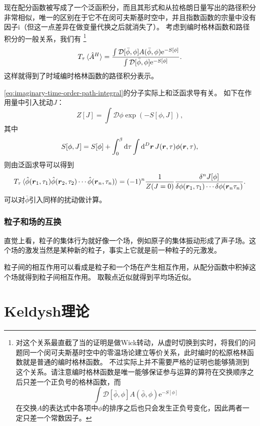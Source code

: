 \documentclass[hyperref, UTF8, a4paper]{ctexart}
\newcommand*{\ii}{\mathrm{i}}
\newcommand*{\ee}{\mathrm{e}}
\newcommand*{\fd}[1]{\mathcal{D}{#1}}
\begin{document}
现在配分函数被写成了一个泛函积分，而且其形式和从拉格朗日量写出的路径积分非常相似，唯一的区别在于它不在闵可夫斯基时空中，并且指数函数的宗量中没有因子$\ii$（但这一点差异在做变量代换之后就消失了）。
考虑到编时格林函数和路径积分的一般关系，我们有%
\footnote{对这个关系最直截了当的证明是做Wick转动，从虚时切换到实时，将我们的问题同一个闵可夫斯基时空中的零温场论建立等价关系，此时编时的松原格林函数就是普通的编时格林函数。
不过实际上并不需要严格的证明也能够猜测到这个关系。请注意编时格林函数是唯一能够保证参与运算的算符在交换顺序之后只差一个正负号的格林函数，而
\[
    \int \fd{[\bar{\phi}, \phi]} A(\bar{\phi}, \phi) \ee^{- S[\phi]}
\]
在交换$A$的表达式中各项中$\phi$的排序之后也只会发生正负号变化，因此两者一定只差一个常数因子。
}%
\begin{equation}
    T_\tau \expval*{\hat{A}^H} = \frac{\int \fd{[\bar{\phi}, \phi]} A(\bar{\phi}, \phi) \ee^{- S[\phi]}}{\int \fd{[\bar{\phi}, \phi]} \ee^{- S[\phi]}}.
    \label{eq:imaginary-time-order-path-integral}
\end{equation}
这样就得到了时域编时格林函数的路径积分表示。

\eqref{eq:imaginary-time-order-path-integral}的分子实际上和泛函求导有关。
如下在作用量中引入扰动$J$：
\begin{equation}
    Z[J] = \int \fd{\phi} \exp ( - S[\phi, J] ),
\end{equation}
其中
\begin{equation}
    S[\phi, J] = S[\phi] + \int_0^\beta \dd{\tau} \int \dd[D]{\vb*{r}} J(\vb*{r}, \tau) \phi(\vb*{r}, \tau),
\end{equation}
则由泛函求导可以得到
\begin{equation}
    T_\tau \expval*{\hat{\phi}(\vb*{r}_1, \tau_1) \hat{\phi}(\vb*{r}_2, \tau_2) \cdots \hat{\phi}(\vb*{r}_n, \tau_n)} = (-1)^n \frac{1}{Z(J=0)} \frac{\var^n J[\phi]}{\var{\phi(\vb*{r}_1, \tau_1)} \cdots \var{\phi(\vb*{r}_n \tau_n)}}.
\end{equation}
可以对$\bar{\phi}$引入同样的扰动做计算。

\subsubsection{粒子和场的互换}


直觉上看，粒子的集体行为就好像一个场，例如原子的集体振动形成了声子场。这个场的激发当然是某种新的粒子，事实上它就是前一种粒子的元激发。

粒子间的相互作用可以看成是粒子和一个场在产生相互作用，从配分函数中积掉这个场就得到粒子间相互作用。
取鞍点近似就得到平均场近似。


\section{Keldysh理论}
\end{document}
